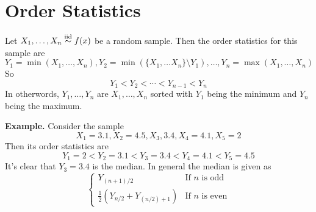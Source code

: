 \documentclass[openany]{report}
\begin{document}
    \section{Order Statistics}
     \begin{definition}
        Let $X_1,\ldots, X_n \overset{\mathrm{iid}}{\sim} f(x)$ be a random sample. Then the order statistics for this sample are 
        \[Y_1 = \min(X_1, \ldots, X_n), Y_2  = \min\left(\{X_1, \ldots X_n\} \setminus Y_1\right), \ldots, Y_n = \max(X_1,\ldots, X_n)\]
        So 
        \[Y_1 < Y_2 < \cdots < Y_{n-1} < Y_n\]
        In otherwords, $Y_1, \ldots, Y_n$ are $X_1, \ldots, X_n$ sorted with $Y_1$ being the minimum and $Y_n$ being the maximum.
     \end{definition}
     \noindent
     \textbf{Example.} Consider the sample 
     \[X_1 = 3.1, X_2 = 4.5, X_3, 3.4, X_4 = 4.1, X_5 = 2\]
     Then its order statistics are 
     \[Y_1 = 2 < Y_2 = 3.1 < Y_3 = 3.4 < Y_4 = 4.1 < Y_5 = 4.5\]
     It's clear that $Y_3 = 3.4$ is the median. In general the median is given as 
     \[\begin{cases}
        Y_{(n+1)/2} & \text{If $n$ is odd}\\
        \frac{1}{2}\left(Y_{n/2} + Y_{(n/2) + 1}\right) & \text{If $n$ is even}
     \end{cases}\]
\end{document}
